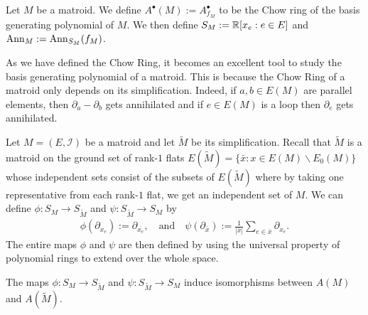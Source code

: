 \documentclass{puthesis-UG}
\begin{document}
\begin{defn}
	Let $M$ be a matroid. We define $A^\bullet(M) := A^\bullet_{f_M}$ to be the Chow ring of the basis generating polynomial of $M$. We then define $S_M := \mathbb{R} [ x_e : e \in E]$ and $\operatorname{Ann}_M := \operatorname{Ann}_{S_M}(f_M)$. 
\end{defn}

As we have defined the Chow Ring, it becomes an excellent tool to study the basis generating polynomial of a matroid. This is because the Chow Ring of a matroid only depends on its simplification. Indeed, if $a, b \in E(M)$ are parallel elements, then $\partial_a - \partial_b$ gets annihilated and if $e \in E(M)$ is a loop then $\partial_e$ gets annihilated. 




Let $M = (E, \mathcal{I})$ be a matroid and let $\widetilde{M}$ be its simplification. Recall that $\widetilde{M}$ is a matroid on the ground set of rank-$1$ flats $E(\widetilde{M}) = \{\bar{x} : x \in E(M) \backslash E_0 (M)\}$ whose independent sets consist of the subsets of $E(\widetilde{M})$ where by taking one representative from each rank-$1$ flat, we get an independent set of $M$. We can define $\phi : S_M \to S_{\widetilde{M}}$ and $\psi : S_{\widetilde{M}} \to S_M$ by 
\begin{align*}
	\phi (\partial_{x_e}) := \partial_{\overline{x_e}}, \quad \text{and} \quad \psi (\partial_{\overline{x}}) := \frac{1}{|\overline{x}|} \sum_{e \in \overline{x}} \partial_{x_e}.
\end{align*}
The entire maps $\phi$ and $\psi$ are then defined by using the universal property of polynomial rings to extend over the whole space. 

\begin{thm} \label{only-simplification-matters}
	The maps $\phi : S_M \to S_{\widetilde{M}}$ and $\psi : S_{\widetilde{M}} \to S_M$ induce isomorphisms between $A(M)$ and $A(\widetilde{M})$. 
\end{thm}
\end{document}
